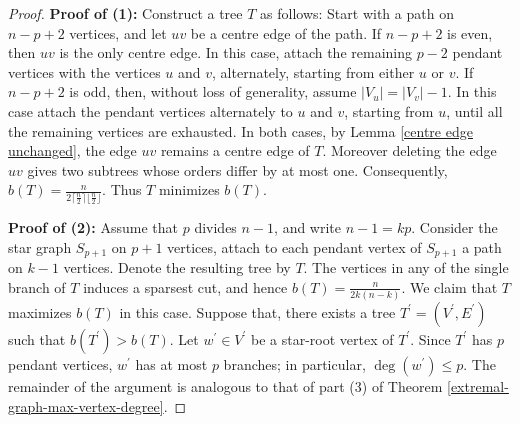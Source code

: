 \documentclass[12pt]{article}
\begin{document}
\begin{proof}

\textbf{Proof of (1):} Construct a tree $T$ as follows:  Start with a path on  $n-p+2$ vertices, and  let $uv$ be a centre edge of the path. If $n-p+2$ is even,  then $uv$ is the only centre edge. In this case,  attach the remaining $p-2$ pendant vertices with the vertices $u$ and $v$, alternately, starting from either $u$ or $v$. If $n-p+2$ is odd, then, without loss of generality, assume $\vert V_u \vert = \vert V_v\vert -1.$ In this case attach the pendant vertices alternately to $u$ and $v$, starting from $u$, until all the remaining vertices are exhausted. In both cases, by Lemma \ref{centre edge unchanged}, the edge $uv$  remains  a centre edge of $T$. Moreover deleting the edge $uv$ gives two subtrees whose orders differ by at most one. Consequently, $b(T) = \frac{n}{2\lceil \frac{n}{2}\rceil \lfloor \frac{n}{2}\rfloor}$. Thus $T$ minimizes $b(T)$.





\noindent\textbf{Proof of (2):} Assume that $p$ divides $n-1$, and write $n-1 = kp$. Consider the star graph $S_{p+1}$ on $p+1$ vertices, attach to each pendant vertex of $S_{p+1}$ a path on $k-1$ vertices. Denote the resulting tree by $T$. The vertices in any of the single branch of $T$ induces a sparsest cut, and hence $b(T)=\frac{n}{2k(n-k)}$. We claim that $T$ maximizes $b(T)$ in this case. Suppose that, there exists a tree $T^\prime=(V^\prime,E^\prime)$ such that $b(T^\prime)>b(T)$. Let $w^\prime \in V^\prime$ be a star-root vertex of $T^\prime.$ Since $T^\prime$ has $p$ pendant vertices, $w^\prime$ has at most $p$ branches; in particular,  $\deg(w^\prime)\leq p$. The remainder of the argument is analogous to that of part (3) of Theorem \ref{extremal-graph-max-vertex-degree}. 


\end{proof}
\end{document}
